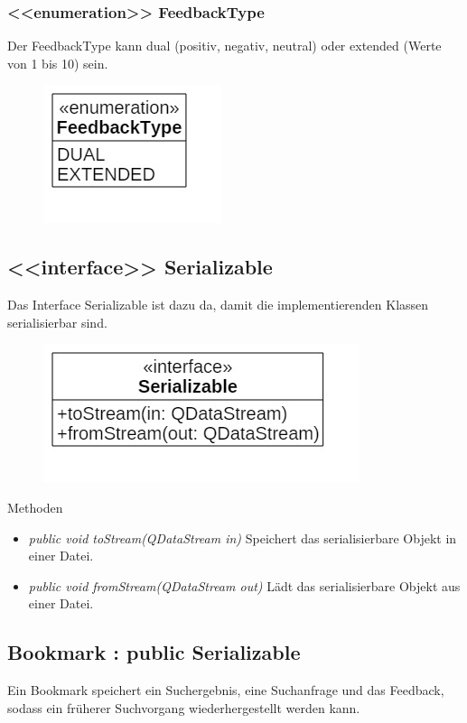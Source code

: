\subsubsection*{<<enumeration>> FeedbackType}
Der FeedbackType kann dual (positiv, negativ, neutral) oder extended (Werte von 1 bis 10) sein.

\begin{figure}[H]
\centering
\includegraphics[scale=0.5]{img/Klassendiagramm/Klassen/Model/FeedbackType}
\label{fig:feedbackType}
\end{figure}

\subsection*{<<interface>> Serializable}
Das Interface Serializable ist dazu da, damit die implementierenden Klassen serialisierbar sind.

\begin{figure}[H]
\centering
\includegraphics[scale=0.5]{img/Klassendiagramm/Klassen/Model/Serializable}
\label{fig:serializable}
\end{figure}

Methoden
\begin{itemize}
\item \textit{public void toStream(QDataStream in)} Speichert das serialisierbare Objekt in einer Datei.
\item \textit{public void fromStream(QDataStream out)} Lädt das serialisierbare Objekt aus einer Datei.
\end{itemize}

\subsection*{Bookmark : public Serializable}
Ein Bookmark speichert ein Suchergebnis, eine Suchanfrage und das Feedback, sodass ein früherer Suchvorgang wiederhergestellt werden kann.

